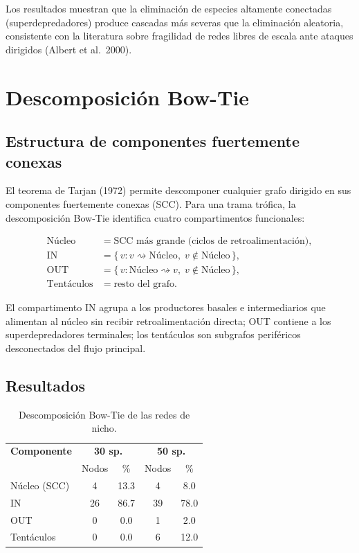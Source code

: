 \documentclass[12pt, a4paper]{article}
\begin{document}
Los resultados muestran que la eliminación de especies altamente conectadas
(superdepredadores) produce cascadas más severas que la eliminación aleatoria,
consistente con la literatura sobre fragilidad de redes libres de escala ante ataques
dirigidos (Albert et al.\ 2000).

\section{Descomposición Bow-Tie}

\subsection{Estructura de componentes fuertemente conexas}

El teorema de Tarjan (1972) permite descomponer cualquier grafo dirigido en sus
componentes fuertemente conexas (SCC). Para una trama trófica, la descomposición
Bow-Tie identifica cuatro compartimentos funcionales:

\begin{align}
    \text{Núcleo} &= \text{SCC más grande (ciclos de retroalimentación)}, \\
    \text{IN}     &= \{\,v : v \rightsquigarrow \text{Núcleo},\; v \notin \text{Núcleo}\,\}, \\
    \text{OUT}    &= \{\,v : \text{Núcleo} \rightsquigarrow v,\; v \notin \text{Núcleo}\,\}, \\
    \text{Tentáculos} &= \text{resto del grafo}.
\end{align}

El compartimento IN agrupa a los productores basales e intermediarios que alimentan
al núcleo sin recibir retroalimentación directa; OUT contiene a los superdepredadores
terminales; los tentáculos son subgrafos periféricos desconectados del flujo principal.

\subsection{Resultados}

\begin{table}[H]
\centering
\caption{Descomposición Bow-Tie de las redes de nicho.}
\label{tab:bowtie}
\renewcommand{\arraystretch}{1.3}
\begin{tabular}{lcccc}
\toprule
\textbf{Componente} & \multicolumn{2}{c}{\textbf{30 sp.}} & \multicolumn{2}{c}{\textbf{50 sp.}} \\
                    & Nodos & \% & Nodos & \% \\
\midrule
Núcleo (SCC)   & 4  & 13.3 & 4  & 8.0  \\
IN             & 26 & 86.7 & 39 & 78.0 \\
OUT            & 0  &  0.0 & 1  & 2.0  \\
Tentáculos     & 0  &  0.0 & 6  & 12.0 \\
\bottomrule
\end{tabular}
\end{table}
\end{document}
